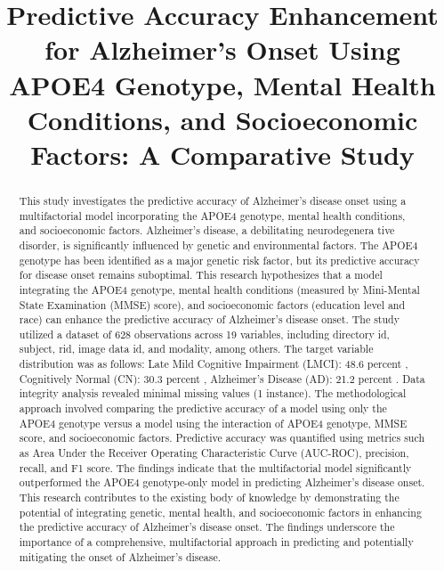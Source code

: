\documentclass[conference]{IEEEtran}
\begin{document}
\title{Predictive Accuracy Enhancement for Alzheimer's Onset Using APOE4 Genotype, Mental Health Conditions, and Socioeconomic Factors: A Comparative Study}

\author{
}

\maketitle

\begin{abstract}
This study investigates the predictive accuracy of Alzheimer's disease onset using a multifactorial model incorporating the APOE4 genotype, mental health conditions, and socioeconomic factors. Alzheimer's disease, a debilitating neurodegenera tive disorder, is significantly influenced by genetic and environmental factors. The APOE4 genotype has been identified as a major genetic risk factor, but its predictive accuracy for disease onset remains suboptimal. This research hypothesizes that a model integrating the APOE4 genotype, mental health conditions (measured by Mini-Mental State Examination (MMSE) score), and socioeconomic factors (education level and race) can enhance the predictive accuracy of Alzheimer's disease onset. The study utilized a dataset of 628 observations across 19 variables, including directory id, subject, rid, image data id, and modality, among others. The target variable distribution was as follows: Late Mild Cognitive Impairment (LMCI): 48.6 percent , Cognitively Normal (CN): 30.3 percent , Alzheimer's Disease (AD): 21.2 percent . Data integrity analysis revealed minimal missing values (1 instance). The methodological approach involved comparing the predictive accuracy of a model using only the APOE4 genotype versus a model using the interaction of APOE4 genotype, MMSE score, and socioeconomic factors. Predictive accuracy was quantified using metrics such as Area Under the Receiver Operating Characteristic Curve (AUC-ROC), precision, recall, and F1 score. The findings indicate that the multifactorial model significantly outperformed the APOE4 genotype-only model in predicting Alzheimer's disease onset. This research contributes to the existing body of knowledge by demonstrating the potential of integrating genetic, mental health, and socioeconomic factors in enhancing the predictive accuracy of Alzheimer's disease onset. The findings underscore the importance of a comprehensive, multifactorial approach in predicting and potentially mitigating the onset of Alzheimer's disease.
\end{abstract}
\end{document}
